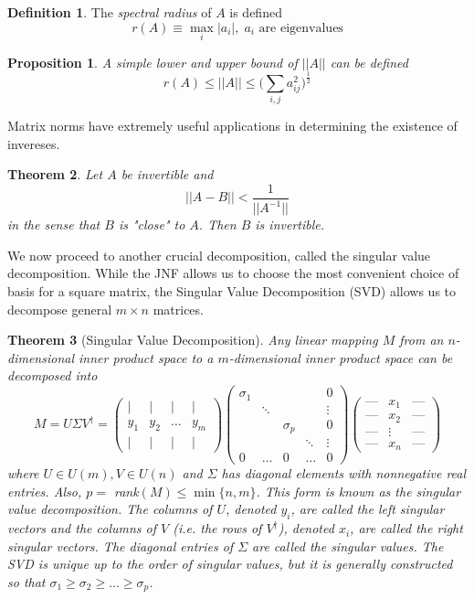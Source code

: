 \documentclass{article}
\newtheorem{theorem}{Theorem}[section]
\newtheorem{proposition}[theorem]{Proposition}
\theoremstyle{remark}
\theoremstyle{definition}
\newtheorem{definition}{Definition}[section]
\begin{document}
\begin{definition}
The \textit{spectral radius} of $A$ is defined
\[r(A) \equiv \max_i |a_i|, \; a_i \text{ are eigenvalues}\]
\end{definition}

\begin{proposition}
A simple lower and upper bound of $||A||$ can be defined
\[ r(A) \leq ||A|| \leq \bigg( \sum_{i, j} a_{i j}^2 \bigg)^\frac{1}{2}\]
\end{proposition}

Matrix norms have extremely useful applications in determining the existence of invereses. 

\begin{theorem}
Let $A$ be invertible and 
\[||A - B|| < \frac{1}{||A^{-1}||}\]
in the sense that $B$ is "close" to $A$. Then $B$ is invertible. 
\end{theorem}
We now proceed to another crucial decomposition, called the singular value decomposition. While the JNF allows us to choose the most convenient choice of basis for a square matrix, the Singular Value Decomposition (SVD) allows us to decompose general $m \times n$ matrices. 

\begin{theorem}[Singular Value Decomposition]
Any linear mapping $M$ from an $n$-dimensional inner product space to a $m$-dimensional inner product space can be decomposed into 
\[ M = U \Sigma V^\dagger = \begin{pmatrix}
 \vert & \vert & \vert & \vert\\
y_1 & y_2 & \ldots & y_m \\
\vert & \vert & \vert & \vert
\end{pmatrix}\begin{pmatrix}
\sigma_1 & & & &0\\
&\ddots &&& \vdots \\
& & \sigma_p & & 0\\
& & & \ddots &\vdots \\
0 & \ldots &0& \ldots &0
\end{pmatrix} \begin{pmatrix}
\text{---}&x_1&\text{---} \\
\text{---}&x_2&\text{---} \\
\text{---}&\vdots&\text{---} \\
\text{---}&x_n&\text{---}
\end{pmatrix} \]
where $U \in U(m), V \in U(n)$ and $\Sigma$ has diagonal elements with nonnegative real entries. Also, $p = $ rank$(M) \leq \min{\{n,m\}}$. This form is known as the \textit{singular value decomposition}. The columns of $U$, denoted $y_i$, are called the \textit{left singular vectors} and the columns of $V$ (i.e. the rows of $V^\dagger$), denoted $x_i$, are called the \textit{right singular vectors}. The diagonal entries of $\Sigma$ are called the \textit{singular values}. The SVD is unique up to the order of singular values, but it is generally constructed so that $\sigma_1 \geq \sigma_2 \geq ... \geq \sigma_p$. 
\end{theorem}
\end{document}
